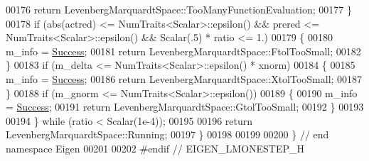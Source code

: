 \begin{DoxyCode}
00176       \textcolor{keywordflow}{return} LevenbergMarquardtSpace::TooManyFunctionEvaluation;
00177     \}
00178     \textcolor{keywordflow}{if} (abs(actred) <= NumTraits<Scalar>::epsilon() && prered <= NumTraits<Scalar>::epsilon() && Scalar(.5)
       * ratio <= 1.)
00179     \{
00180       m\_info = \hyperlink{group__enums_gga85fad7b87587764e5cf6b513a9e0ee5ea52581b035f4b59c203b8ff999ef5fcea}{Success};
00181       \textcolor{keywordflow}{return} LevenbergMarquardtSpace::FtolTooSmall;
00182     \}
00183     \textcolor{keywordflow}{if} (m\_delta <= NumTraits<Scalar>::epsilon() * xnorm) 
00184     \{
00185       m\_info = \hyperlink{group__enums_gga85fad7b87587764e5cf6b513a9e0ee5ea52581b035f4b59c203b8ff999ef5fcea}{Success};
00186       \textcolor{keywordflow}{return} LevenbergMarquardtSpace::XtolTooSmall;
00187     \}
00188     \textcolor{keywordflow}{if} (m\_gnorm <= NumTraits<Scalar>::epsilon())
00189     \{
00190       m\_info = \hyperlink{group__enums_gga85fad7b87587764e5cf6b513a9e0ee5ea52581b035f4b59c203b8ff999ef5fcea}{Success};
00191       \textcolor{keywordflow}{return} LevenbergMarquardtSpace::GtolTooSmall;
00192     \}
00193 
00194   \} \textcolor{keywordflow}{while} (ratio < Scalar(1e-4));
00195 
00196   \textcolor{keywordflow}{return} LevenbergMarquardtSpace::Running;
00197 \}
00198 
00199   
00200 \} \textcolor{comment}{// end namespace Eigen}
00201 
00202 \textcolor{preprocessor}{#endif // EIGEN\_LMONESTEP\_H}
\end{DoxyCode}
